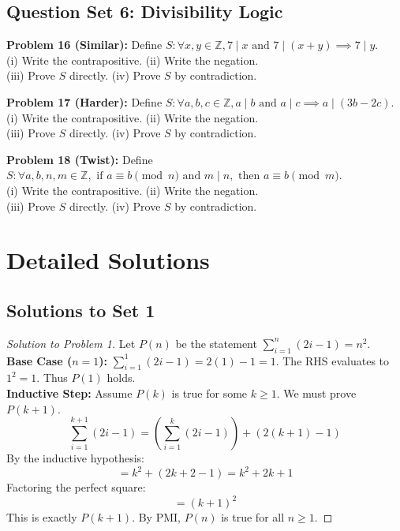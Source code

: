 \documentclass{article}
\begin{document}
\subsection{Question Set 6: Divisibility Logic}
\noindent\textbf{Problem 16 (Similar):} Define $S: \forall x,y \in \mathbb{Z}, 7 \mid x \text{ and } 7 \mid (x+y) \implies 7 \mid y$. \\
(i) Write the contrapositive. (ii) Write the negation. \\
(iii) Prove $S$ directly. (iv) Prove $S$ by contradiction.

\noindent\textbf{Problem 17 (Harder):} Define $S: \forall a,b,c \in \mathbb{Z}, a \mid b \text{ and } a \mid c \implies a \mid (3b - 2c)$. \\
(i) Write the contrapositive. (ii) Write the negation. \\
(iii) Prove $S$ directly. (iv) Prove $S$ by contradiction.

\noindent\textbf{Problem 18 (Twist):} Define $S: \forall a,b,n,m \in \mathbb{Z}, \text{ if } a \equiv b \pmod n \text{ and } m \mid n, \text{ then } a \equiv b \pmod m$. \\
(i) Write the contrapositive. (ii) Write the negation. \\
(iii) Prove $S$ directly. (iv) Prove $S$ by contradiction.

\newpage
\section{Detailed Solutions}

\subsection{Solutions to Set 1}
\begin{proof}[Solution to Problem 1]
Let $P(n)$ be the statement $\sum_{i=1}^n (2i - 1) = n^2$. \\
\textbf{Base Case ($n=1$):} $\sum_{i=1}^1 (2i - 1) = 2(1) - 1 = 1$. The RHS evaluates to $1^2 = 1$. Thus $P(1)$ holds. \\
\textbf{Inductive Step:} Assume $P(k)$ is true for some $k \ge 1$. We must prove $P(k+1)$.
\[ \sum_{i=1}^{k+1} (2i - 1) = \left( \sum_{i=1}^k (2i - 1) \right) + (2(k+1) - 1) \]
By the inductive hypothesis:
\[ = k^2 + (2k + 2 - 1) = k^2 + 2k + 1 \]
Factoring the perfect square:
\[ = (k+1)^2 \]
This is exactly $P(k+1)$. By PMI, $P(n)$ is true for all $n \ge 1$.
\end{proof}
\end{document}
